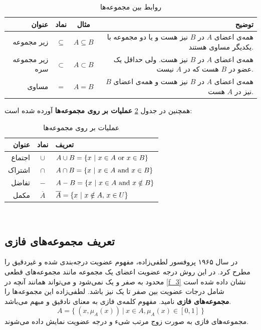 \documentclass[12pt,a4paper]{article}
\begin{document}
\begin{table}[!htbp]
\begin{center}
	{\footnotesize
 \begin{tabular}{r c c r} \hline
عنوان & نماد &  مثال & توضیح  
\\\hline 
زیر مجموعه  &
$\subseteq$ &
$A \subseteq B$ &
همه‌ی اعضای $A$ در $B$ نیز هست و یا دو مجموعه با یکدیگر مساوی هستند.
\\
زیر مجموعه سره &
$\subset$ &
 $A \subset B$ &
همه‌ی اعضای $A$ در $B$ نیز هست. ولی حداقل یک عضو در $B$ هست که در $A$ نیست.
\\
مساوی &
$=$ &
$A = B$ &
همه‌ی اعضای $A$ در $B$ نیز هست و همه‌ی اعضای $B$ نیز در $A$ هست.
\\\hline
 \end{tabular}
 \caption{روابط بین مجموعه‌ها}
 \label{table:t_1}
}
\end{center}
\end{table}
همچنین در جدول
\ref{table:t_2}
\textbf{عملیات بر روی مجموعه‌ها} 
 آورده شده‌ است:
\begin{table}[h]
	{\footnotesize
	\begin{center}
		\begin{tabular}{r c l} \hline
			عنوان & نماد & تعریف  
			\\\hline 
			اجتماع   &
			$\cup$ &
			$A \cup B = \{x\ |\ x \in A\ {\rm or}\ x \in B \}$ 
			\\
			اشتراک   &
			$\cap$ &
			$A \cap B = \{x\ |\ x \in A\ {\rm and}\ x \in B \}$ 
			\\
			تفاضل &
			$-$ &
			$A - B = \{x\ |\ x \in A\ {\rm and}\ x \notin B \}$ 
		   \\
			مکمل &
			$\overline{A}$ &
			$\overline{A} = \{x\ |\ x \notin A{\rm ,}\ x \in U \}$ 
			\\\hline 
		\end{tabular}
		\caption{عملیات بر روی مجموعه‌ها}
		\label{table:t_2}
\end{center}
	}
\end{table} 
\\
 \subsection{تعریف مجموعه‌های فازی}
در سال ۱۹۶۵ پروفسور لطفی‌زاده، مفهوم عضویت درجه‌بندی شده و غیردقیق را مطرح کرد. در این روش درجه عضویت اعضای یک مجموعه مانند مجموعه‌های قطعی محدود به صفر و یک نمی‌شود و می‌تواند همانند آنچه در 
\ref{f_3}
نشان داده شده است شامل درجات عضویت بین صفر تا یک نیز باشد. لطفی‌زاده این مجموعه‌ها را 
\textbf{مجموعه‌های فازی}
 نامید. مفهوم کلمه‌ی فازی به معنای نادقیق و مبهم می‌باشد.
\begin{equation}\label{f_3}
A= \{\  (x, \mu_{A}(x))\ |\ x \in A, \mu_{A}(x) \in [0,1]\  \}
\end{equation} 
مجموعه‌های فازی به صورت زوج مرتب شیء و درجه عضویت نمایش داده می‌شوند. 
\end{document}
